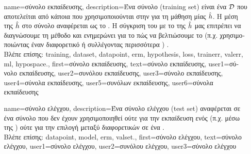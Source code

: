 {name={\foreignlanguage{greek}{σύνολο εκπαίδευσης}},
	description={\foreignlanguage{greek}{Ένα σύνολο}  (training set)  
		\foreignlanguage{greek}{είναι ένα}  $\mathcal{D}$ \foreignlanguage{greek}{που αποτελείται από κάποια} 
		 \foreignlanguage{greek}{που χρησιμοποι\-ού\-νται στην}  \foreignlanguage{greek}{για τη μάθηση 
		μίας}  $\hat{h}$. \foreignlanguage{greek}{Η μέση}  \foreignlanguage{greek}{της 
		$\hat{h}$ στο σύνολο}  \foreignlanguage{greek}{αναφέρεται ως το} . 
		\foreignlanguage{greek}{Η σύγκριση του}  \foreignlanguage{greek}{με το}  
		 \foreignlanguage{greek}{της $\hat{h}$ μας επιτρέπει να διαγνώσουμε τη μέθοδο}  
		\foreignlanguage{greek}{και ενημερώνει για το πώς να βελτιώσουμε το}  
		\foreignlanguage{greek}{(π.χ. χρησιμοποιώντας έναν διαφορετικό}  
		\foreignlanguage{greek}{ή συλλέγοντας περισσότερα} ) \cite[\foreignlanguage{greek}{Ενότητα} 6.6]{MLBasics}.
		\\
		\foreignlanguage{greek}{Βλέπε επίσης:} \gls{training}, \gls{dataset}, \gls{datapoint}, \gls{erm}, \gls{hypothesis}, \gls{loss}, \gls{trainerr}, 
		\gls{valerr}, \gls{ml}, \gls{hypospace}.},
	first={\foreignlanguage{greek}{σύνολο εκπαίδευσης}},
	text={\foreignlanguage{greek}{σύ\-νο\-λο εκ\-παί\-δευ\-σης}},
	user1={\foreignlanguage{greek}{σύνολο εκπαίδευσης}}, %
	user2={\foreignlanguage{greek}{συνόλου εκπαίδευσης}}, %
	user3={\foreignlanguage{greek}{σύνολο εκπαί\-δευσης}}, %
	user4={\foreignlanguage{greek}{σύνολα εκπαίδευσης}}, %
	user5={\foreignlanguage{greek}{συνόλων εκπαί\-δευ\-σης}}, %
	user6={\foreignlanguage{greek}{σύνολα εκπαίδευσης}} %
}

{name={\foreignlanguage{greek}{σύνολο ελέγχου}},
	description={\foreignlanguage{greek}{Ένα σύνολο ελέγχου} (test set) 
		\foreignlanguage{greek}{αναφέρεται σε ένα σύνολο}  
		\foreignlanguage{greek}{που δεν έχουν χρησιμοποιηθεί ούτε για την εκ\-παί\-δευση ενός}  
		(\foreignlanguage{greek}{π.χ. μέσω της} ) \foreignlanguage{greek}{ούτε για την επιλογή μεταξύ 
		διαφορετικών}  \foreignlanguage{greek}{σε ένα} .
		\\
		\foreignlanguage{greek}{Βλέπε επίσης:} \gls{datapoint}, \gls{model}, \gls{erm}, \gls{valset}.},
	first={\foreignlanguage{greek}{σύνολο ελέγχου}},
	text={\foreignlanguage{greek}{σύνολο ελέγχου}}, 
	user1={\foreignlanguage{greek}{σύνολο ελέγχου}}, %
	user2={\foreignlanguage{greek}{συνόλου ελέγχου}}, %
	user3={\foreignlanguage{greek}{σύνολο ελέγχου}} %
}

